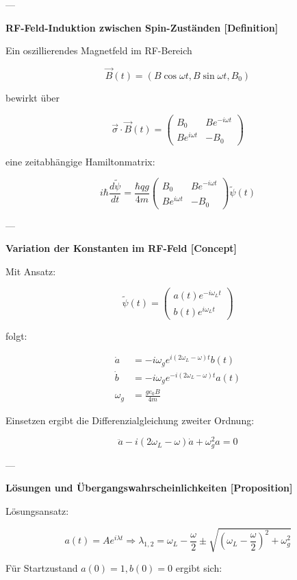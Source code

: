 \documentclass[10pt, letterpaper]{article}
\begin{document}
---

\textbf{RF-Feld-Induktion zwischen Spin-Zuständen [Definition]}

Ein oszillierendes Magnetfeld im RF-Bereich

\[
\vec{B}(t) = \left( B \cos \omega t, B \sin \omega t, B_0 \right)
\]

bewirkt über

\[
\vec{\sigma} \cdot \vec{B}(t)
= \begin{pmatrix} B_0 & B e^{-i\omega t} \\ B e^{i\omega t} & -B_0 \end{pmatrix}
\]

eine zeitabhängige Hamiltonmatrix:

\[
i \hbar \frac{d \tilde{\psi}}{dt}
= \frac{\hbar q g}{4m}
\begin{pmatrix} B_0 & B e^{-i\omega t} \\ B e^{i\omega t} & -B_0 \end{pmatrix}
\tilde{\psi}(t)
\]

---

\textbf{Variation der Konstanten im RF-Feld [Concept]}

Mit Ansatz:

\[
\tilde{\psi}(t) =
\begin{pmatrix}
a(t) e^{-i\omega_L t} \\
b(t) e^{i\omega_L t}
\end{pmatrix}
\]

folgt:

\[
\begin{aligned}
\dot{a} &= -i \omega_g e^{i(2\omega_L - \omega)t} b(t) \\
\dot{b} &= -i \omega_g e^{-i(2\omega_L - \omega)t} a(t) \\
\omega_g &= \frac{g e_0 B}{4 m}
\end{aligned}
\]

Einsetzen ergibt die Differenzialgleichung zweiter Ordnung:

\[
\ddot{a} - i(2\omega_L - \omega)\dot{a} + \omega_g^2 a = 0
\]

---

\textbf{Lösungen und Übergangswahrscheinlichkeiten [Proposition]}

Lösungsansatz:

\[
a(t) = A e^{i\lambda t}
\Rightarrow
\lambda_{1,2} = \omega_L - \frac{\omega}{2} \pm \sqrt{\left(\omega_L - \frac{\omega}{2}\right)^2 + \omega_g^2}
\]

Für Startzustand \( a(0)=1, b(0)=0 \) ergibt sich:
\end{document}
